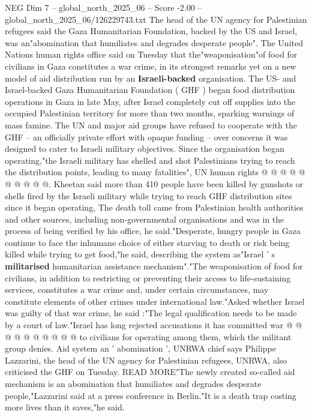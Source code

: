 \begin{textsample}{NEG Dim 7 – global\_north\_2025\_06 – Score -2.00 – global\_north\_2025\_06/126229743.txt}  \label{ex:f7_neg_075}
The head of the UN agency for Palestinian refugees said the Gaza Humanitarian Foundation, backed by the US and Israel, was an"abomination that humiliates and degrades desperate people".
The United Nations human rights office said on Tuesday that the"weaponisation"of food for civilians in Gaza constitutes a war crime, in its strongest remarks yet on a new model of aid distribution run by an \textbf{Israeli-backed} organisation.
The US- and Israel-backed Gaza Humanitarian Foundation ( GHF ) began food distribution operations in Gaza in late May, after Israel completely cut off supplies into the occupied Palestinian territory for more than two months, sparking warnings of mass famine.
The UN and major aid groups have refused to cooperate with the GHF -- an officially private effort with opaque funding -- over concerns it was designed to cater to Israeli military objectives.
Since the organisation began operating,"the Israeli military has shelled and shot Palestinians trying to reach the distribution points, leading to many fatalities", UN human rights @ @ @ @ @ @ @ @ @ @.
Kheetan said more than 410 people have been killed by gunshots or shells fired by the Israeli military while trying to reach GHF distribution sites since it began operating, The death toll came from Palestinian health authorities and other sources, including non-governmental organisations and was in the process of being verified by his office, he said."Desperate, hungry people in Gaza continue to face the inhumane choice of either starving to death or risk being killed while trying to get food,"he said, describing the system as"Israel ' s \textbf{militarised} humanitarian assistance mechanism"."The weaponisation of food for civilians, in addition to restricting or preventing their access to life-sustaining services, constitutes a war crime and, under certain circumstances, may constitute elements of other crimes under international law."Asked whether Israel was guilty of that war crime, he said :"The legal qualification needs to be made by a court of law."Israel has long rejected accusations it has committed war @ @ @ @ @ @ @ @ @ @ to civilians for operating among them, which the militant group denies.
Aid system an ' abomination ', UNRWA chief says Philippe Lazzarini, the head of the UN agency for Palestinian refugees, UNRWA, also criticised the GHF on Tuesday.
READ MORE"The newly created so-called aid mechanism is an abomination that humiliates and degrades desperate people,"Lazzarini said at a press conference in Berlin."It is a death trap costing more lives than it saves,"he said.

\end{textsample}
